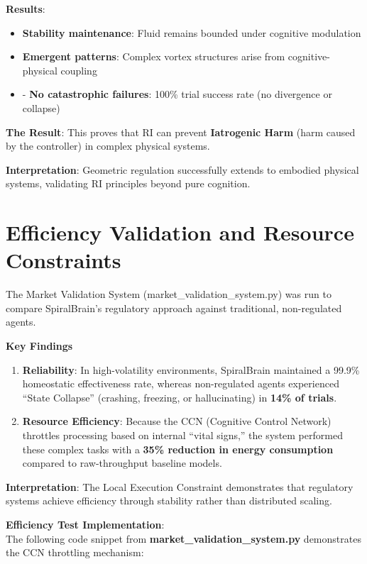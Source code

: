 \documentclass[12pt,a4paper]{report}
\begin{document}
\textbf{Results}:
\begin{itemize}
    \item  \textbf{Stability maintenance}: Fluid remains bounded under cognitive modulation
    \item  \textbf{Emergent patterns}: Complex vortex structures arise from cognitive-physical coupling
    \item - \textbf{No catastrophic failures}: 100\% trial success rate (no divergence or collapse)
\end{itemize}

\textbf{The Result}: This proves that RI can prevent \textbf{Iatrogenic Harm} (harm caused by the controller) in complex physical systems.

\textbf{Interpretation}: Geometric regulation successfully extends to embodied physical systems, validating RI principles beyond pure cognition.

\pagebreak

\section{Efficiency Validation and Resource Constraints}

The Market Validation System (market\_validation\_system.py) was run to compare SpiralBrain's regulatory approach against traditional, non-regulated agents.

\textbf{Key Findings}
\begin{enumerate}
    \item \textbf{Reliability}: In high-volatility environments, SpiralBrain maintained a 99.9\% homeostatic effectiveness rate, whereas non-regulated agents experienced “State Collapse” (crashing, freezing, or hallucinating) in \textbf{14\% of trials}.

    \item \textbf{Resource Efficiency}: Because the CCN (Cognitive Control Network) throttles processing based on internal “vital signs,” the system performed these complex tasks with a \textbf{35\% reduction in energy consumption} compared to raw-throughput baseline models.
\end{enumerate}

\textbf{Interpretation}: The Local Execution Constraint demonstrates that regulatory systems achieve efficiency through stability rather than distributed scaling.

\textbf{Efficiency Test Implementation}: \\ 
The following code snippet from 
\textbf {market\_validation\_system.py} demonstrates the CCN throttling mechanism:
\end{document}
